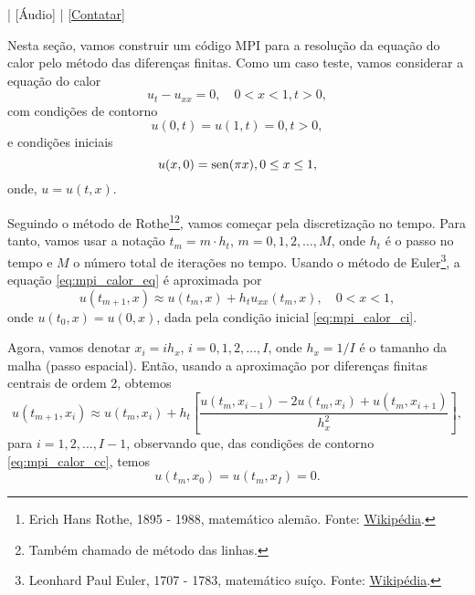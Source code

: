 \begin{flushright}
  [Vídeo] | [Áudio] | \href{https://phkonzen.github.io/notas/contato.html}{[Contatar]}
\end{flushright}

Nesta seção, vamos construir um código MPI para a resolução da equação do calor pelo método das diferenças finitas. Como um caso teste, vamos considerar a equação do calor
\begin{equation}\label{eq:mpi_calor_eq}
  u_t - u_{xx} = 0,\quad 0<x<1, t>0,
\end{equation}
com condições de contorno
\begin{equation}\label{eq:mpi_calor_cc}
  u(0,t) = u(1,t) = 0, t>0,
\end{equation}
e condições iniciais
\begin{equation}\label{eq:mpi_calor_ci}
  u(x,0) = \operatorname{sen}(\pi x), 0\leq x\leq 1,
\end{equation}
onde, $u = u(t, x)$.

Seguindo o método de Rothe\footnote{Erich Hans Rothe, 1895 - 1988, matemático alemão. Fonte: \href{https://pt.wikipedia.org/wiki/Erich_Rothe}{Wikipédia}.}\footnote{Também chamado de método das linhas.}, vamos começar pela discretização no tempo. Para tanto, vamos usar a notação $t_m = m\cdot h_t$, $m=0,1,2,\dotsc,M$, onde $h_t$ é o passo no tempo e $M$ o número total de iterações no tempo. Usando o método de Euler\footnote{Leonhard Paul Euler, 1707 - 1783, matemático suíço. Fonte: \href{https://pt.wikipedia.org/wiki/Leonhard_Euler}{Wikipédia}.}, a equação \eqref{eq:mpi_calor_eq} é aproximada por
\begin{equation}\label{eq:mpi_color_eq_euler}
  u(t_{m+1}, x) \approx u(t_m, x) + h_t u_{xx}(t_m, x),\quad 0<x<1,
\end{equation}
onde $u(t_0, x) = u(0, x)$, dada pela condição inicial \eqref{eq:mpi_calor_ci}.

Agora, vamos denotar $x_i=ih_x$, $i=0,1,2,\dotsc,I$, onde $h_x=1/I$ é o tamanho da malha (passo espacial). Então, usando a aproximação por diferenças finitas centrais de ordem 2, obtemos
\begin{equation}
  u(t_{m+1}, x_i) \approx u(t_m, x_i) + h_t \left[\frac{u(t_m,x_{i-1}) - 2u(t_m, x_i) + u(t_m, x_{i+1})}{h_x^2}\right],
\end{equation}
para $i=1,2,\dotsc,I-1$, observando que, das condições de contorno \eqref{eq:mpi_calor_cc}, temos
\begin{equation}
  u(t_m, x_0) = u(t_m, x_I) = 0.
\end{equation}

